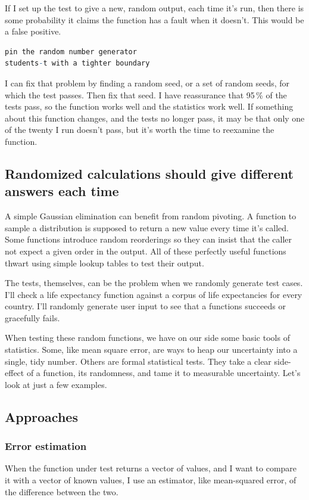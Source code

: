 \documentclass[fleqn,10pt]{olplainarticle}
\begin{document}
If I set up the test to give a new, random output, each time it's run,
then there is some probability it claims the function has a fault
when it doesn't. This would be a false positive.

\begin{lstlisting}[language=R]
pin the random number generator
students-t with a tighter boundary
\end{lstlisting}

I can fix that problem by finding a random seed, or a set of
random seeds, for which the test passes. Then fix that seed.
I have reassurance that 95\,\% of the tests pass, so the function
works well and the statistics work well. If something about this
function changes, and the tests no longer pass, it may be that only
one of the twenty I run doesn't pass, but it's worth the time to
reexamine the function.



\subsection{Randomized calculations should give different answers each time}

A simple Gaussian elimination can benefit from random pivoting.
A function to sample a distribution is supposed to return a new value
every time it's called.
Some functions introduce random reorderings
so they can insist that the caller not expect a given order
in the output. All of these perfectly useful functions
thwart using simple lookup tables to test their output.

The tests, themselves, can be the problem when we randomly
generate test cases. I'll check
a life expectancy function against a corpus of life expectancies
for every country. I'll randomly generate user input
to see that a functions succeeds or gracefully fails.

When testing these random functions,
we have on our side some basic tools
of statistics. Some, like mean square error, are ways
to heap our uncertainty into a single, tidy number.
Others are formal statistical
tests. They take a clear side-effect of a function,
its randomness, and tame it to measurable uncertainty.
Let's look at just a few examples.

\subsection{Approaches}

\subsubsection{Error estimation}
When the function under test returns a vector of values,
and I want to compare it with a vector of known values,
I use an estimator, like mean-squared error, of the difference
between the two.
\end{document}
